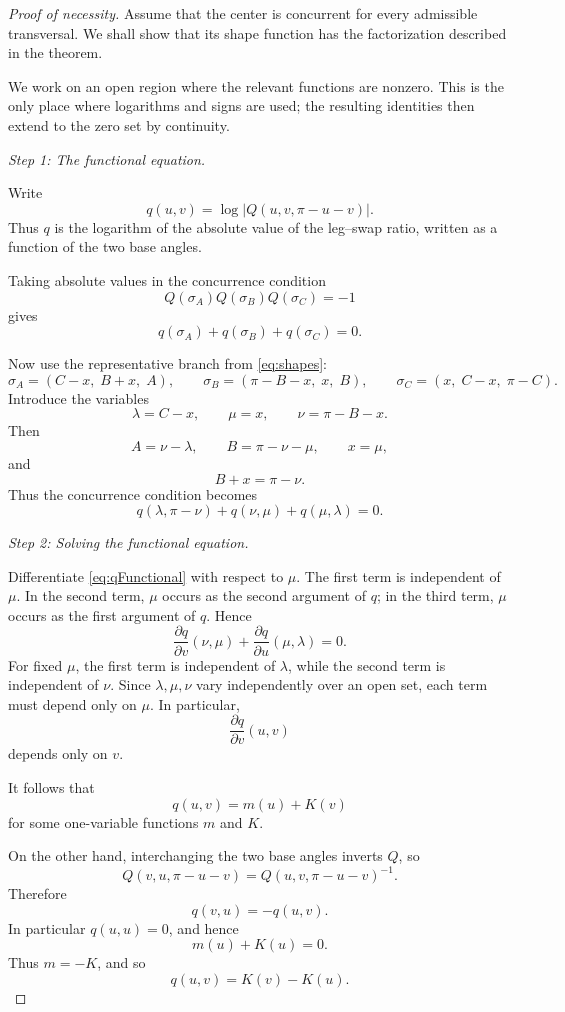 \documentclass[12pt,a4paper]{amsart}
\theoremstyle{remark}
\begin{document}
\begin{proof}[Proof of necessity]
Assume that the center is concurrent for every admissible transversal.  We shall
show that its shape function has the factorization described in the theorem.

We work on an open region where the relevant functions are nonzero.  This is
the only place where logarithms and signs are used; the resulting identities then
extend to the zero set by continuity.

\emph{Step 1: The functional equation.}

Write
\[
q(u,v)=\log\left|Q(u,v,\pi-u-v)\right|.
\]
Thus \(q\) is the logarithm of the absolute value of the leg--swap ratio, written
as a function of the two base angles.

Taking absolute values in the concurrence condition
\[
Q(\sigma_A)Q(\sigma_B)Q(\sigma_C)=-1
\]
gives
\[
q(\sigma_A)+q(\sigma_B)+q(\sigma_C)=0.
\]

Now use the representative branch from \eqref{eq:shapes}:
\[
\sigma_A=(C-x,\;B+x,\;A),\qquad
\sigma_B=(\pi-B-x,\;x,\;B),\qquad
\sigma_C=(x,\;C-x,\;\pi-C).
\]
Introduce the variables
\[
\lambda=C-x,\qquad \mu=x,\qquad \nu=\pi-B-x.
\]
Then
\[
A=\nu-\lambda,\qquad B=\pi-\nu-\mu,\qquad x=\mu,
\]
and
\[
B+x=\pi-\nu.
\]
Thus the concurrence condition becomes
\begin{equation}
\label{eq:qFunctional}
q(\lambda,\pi-\nu)+q(\nu,\mu)+q(\mu,\lambda)=0.
\end{equation}

\emph{Step 2: Solving the functional equation.}

Differentiate \eqref{eq:qFunctional} with respect to \(\mu\).  The first term is
independent of \(\mu\).  In the second term, \(\mu\) occurs as the second
argument of \(q\); in the third term, \(\mu\) occurs as the first argument of
\(q\).  Hence
\[
\frac{\partial q}{\partial v}(\nu,\mu)
+
\frac{\partial q}{\partial u}(\mu,\lambda)
=
0.
\]
For fixed \(\mu\), the first term is independent of \(\lambda\), while the
second term is independent of \(\nu\).  Since \(\lambda,\mu,\nu\) vary
independently over an open set, each term must depend only on \(\mu\).  In
particular,
\[
\frac{\partial q}{\partial v}(u,v)
\]
depends only on \(v\).

It follows that
\[
q(u,v)=m(u)+K(v)
\]
for some one-variable functions \(m\) and \(K\).

On the other hand, interchanging the two base angles inverts \(Q\), so
\[
Q(v,u,\pi-u-v)=Q(u,v,\pi-u-v)^{-1}.
\]
Therefore
\[
q(v,u)=-q(u,v).
\]
In particular \(q(u,u)=0\), and hence
\[
m(u)+K(u)=0.
\]
Thus \(m=-K\), and so
\[
q(u,v)=K(v)-K(u).
\]


\end{proof}
\end{document}
